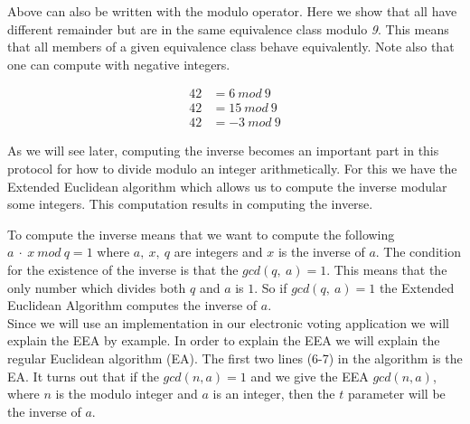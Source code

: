  Above can also be written with the modulo operator. Here we show that all have different remainder but are in the same equivalence class modulo \textit{9}. This means that all members of a given equivalence class behave equivalently. Note also that one can compute with negative integers.

\begin{align*}
42 &= 6 \ mod \ 9 \\
42 &= 15 \ mod \ 9 \\
42 &= -3 \ mod \ 9 
\end{align*}

As we will see later, computing the inverse becomes an important part in this protocol for how to divide modulo an integer arithmetically. For this we have the Extended Euclidean algorithm which allows us to compute the inverse modular some integers. This computation results in computing the inverse.


 To compute the inverse means that we want to compute the following \begin{math}a\ \cdot \ x \ mod \ q = 1 \end{math} where $a, \ x, \ q$ are integers and $x$ is the inverse of $a$. The condition for the existence of the inverse is that the $gcd(q,\ a)= 1$. This means that the only number which divides both $q$ and $a$ is $1$. So if $gcd(q,\ a)= 1$ the Extended Euclidean Algorithm computes the inverse of $a$.\\


 Since we will use an implementation in our electronic voting application we will explain the EEA by example. In order to explain the EEA we will explain the regular Euclidean algorithm (EA). The first two lines (6-7) in the algorithm is the EA. It turns out that if the $gcd(n,a)=1$  and we give the EEA $gcd(n,a)$, where $n$ is the modulo integer and $a$ is an integer, then the $t$ parameter will be the inverse of $a$. 
\cite{Paar}

